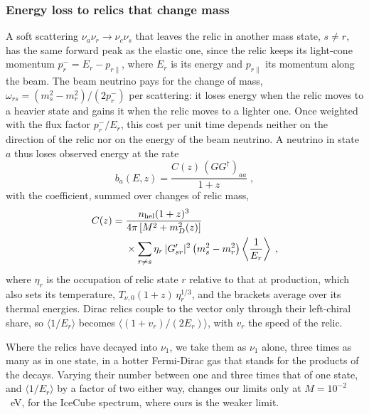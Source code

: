 \documentclass[linenumbers, aps, prd, twocolumn, superscriptaddress, floatfix, longbibliography, nofootinbib, bibnotes]{revtex4-2}
\begin{document}
\subsubsection{Energy loss to relics that change mass}
A soft scattering $\nu_a \nu_r \to \nu_c \nu_s$ that leaves the relic in another mass state, $s \neq r$, has the same forward peak as the elastic one, since the relic keeps its light-cone momentum $p_r^- = E_r - p_{r\parallel}$, where $E_r$ is its energy and $p_{r\parallel}$ its momentum along the beam.
The beam neutrino pays for the change of mass, $\omega_{rs} = (m_s^2 - m_r^2)/(2 p_r^-)$ per scattering: it loses energy when the relic moves to a heavier state and gains it when the relic moves to a lighter one.
Once weighted with the flux factor $p_r^-/E_r$, this cost per unit time depends neither on the direction of the relic nor on the energy of the beam neutrino.
A neutrino in state $a$ thus loses observed energy at the rate
\begin{equation}
 \label{equ:loss}
 b_a(E, z) = \frac{C(z)\, (G G^\dagger)_{aa}}{1+z} \;,
\end{equation}
with the coefficient, summed over changes of relic mass,
\begin{equation}
 \label{equ:loss_coeff}
 \begin{split}
 C(z) = \; & \frac{n_{\rm hel} (1+z)^3}{4\pi\, [M^2 + m_D^2(z)]} \\
 & \times \sum_{r \neq s} \eta_r\, |G'_{sr}|^2 \left( m_s^2 - m_r^2 \right) \left\langle \frac{1}{E_r} \right\rangle \;,
 \end{split}
\end{equation}
where $\eta_r$ is the occupation of relic state $r$ relative to that at production, which also sets its temperature, $T_{\nu,0} (1+z)\, \eta_r^{1/3}$, and the brackets average over its thermal energies.
Dirac relics couple to the vector only through their left-chiral share, so $\langle 1/E_r \rangle$ becomes $\langle (1+v_r)/(2E_r) \rangle$, with $v_r$ the speed of the relic.

Where the relics have decayed into $\nu_1$, we take them as $\nu_1$ alone, three times as many as in one state, in a hotter Fermi-Dirac gas that stands for the products of the decays.
Varying their number between one and three times that of one state, and $\langle 1/E_r \rangle$ by a factor of two either way, changes our limits only at $M = 10^{-2}$~eV, for the IceCube spectrum, where ours is the weaker limit.
\end{document}
